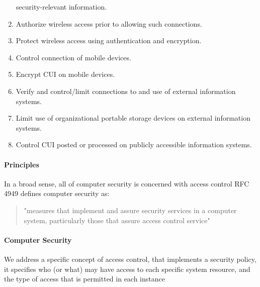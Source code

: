 \documentclass{article}
\begin{document}
\begin{enumerate}
                    security-relevant information.
                    \item Authorize wireless access prior to allowing such connections.
                    \item Protect wireless access using authentication and encryption.
                    \item Control connection of mobile devices.
                    \item Encrypt CUI on mobile devices.
                    \item Verify and control/limit connections to and use of external information
                    systems.
                    \item Limit use of organizational portable storage devices on external information
                    systems.
                    \item Control CUI posted or processed on publicly accessible information systems.
                \end{enumerate}
                
                \paragraph{Principles} In a broad sense, all of computer security is
                concerned with access control RFC 4949 defines computer security as:
                        \begin{quote}
                        "measures that implement and assure
                            security services in a computer system,
                            particularly those that assure access control
                            service"
                        \end{quote}
                \paragraph{Computer Security}
                We address a specific concept of access
                control, that implements a security policy, it specifies who (or what) may have access to each
                specific system resource, and the type of access that is permitted in each
                instance
\end{document}
